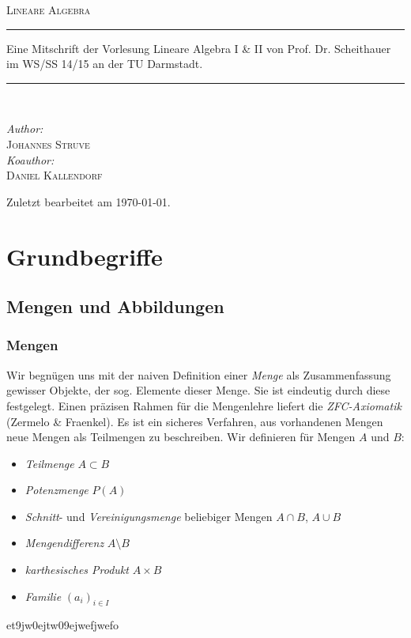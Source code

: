 \documentclass[a4paper,12pt,fleqn]{scrartcl}
\theoremstyle{definition}
\theoremstyle{plain}
\theoremstyle{remark}
\begin{document}
\begin{titlepage}
\begin{center}
\textsc{\LARGE Lineare Algebra}\\[2.0cm]
\rule{\linewidth}{0.5mm}
Eine Mitschrift der Vorlesung Lineare Algebra I \& II von Prof. Dr. Scheithauer im WS/SS 14/15 an der TU Darmstadt.
\rule{\linewidth}{0.5mm}\\[2.0cm]
\begin{minipage}{0.4\textwidth}
\begin{flushleft}
\large \emph{Author:}\\\textsc{Johannes Struve}\\[1.0cm]
\large \emph{Koauthor:}\\\textsc{Daniel Kallendorf}
\end{flushleft}
\end{minipage}
\vfill
Zuletzt bearbeitet am {\large \today}.
\end{center}
\end{titlepage}

\tableofcontents

\newpage

\section{Grundbegriffe}
\subsection{Mengen und Abbildungen}
\subsubsection{Mengen}
Wir begnügen uns mit der naiven Definition einer \emph{Menge} als Zusammenfassung gewisser Objekte, der sog. Elemente dieser Menge. Sie ist eindeutig durch diese festgelegt. Einen präzisen Rahmen für die Mengenlehre liefert die \emph{ZFC-Axiomatik} (Zermelo \& Fraenkel). Es ist ein sicheres Verfahren, aus vorhandenen Mengen neue Mengen als Teilmengen zu beschreiben.
Wir definieren für Mengen $A$ und $B$:
\begin{itemize}
	\item \emph{Teilmenge} $A\subset B$
	\item \emph{Potenzmenge} $P(A)$
	\item \emph{Schnitt}- und \emph{Vereinigungsmenge} beliebiger Mengen $A\cap B$, $A\cup B$
	\item \emph{Mengendifferenz} $A\setminus B$
	\item \emph{karthesisches Produkt} $A\times B$
	\item \emph{Familie} $(a_i)_{i\in I}$
\end{itemize}
\newpage
et9jw0ejtw09ejwefjwefo
\end{document}
